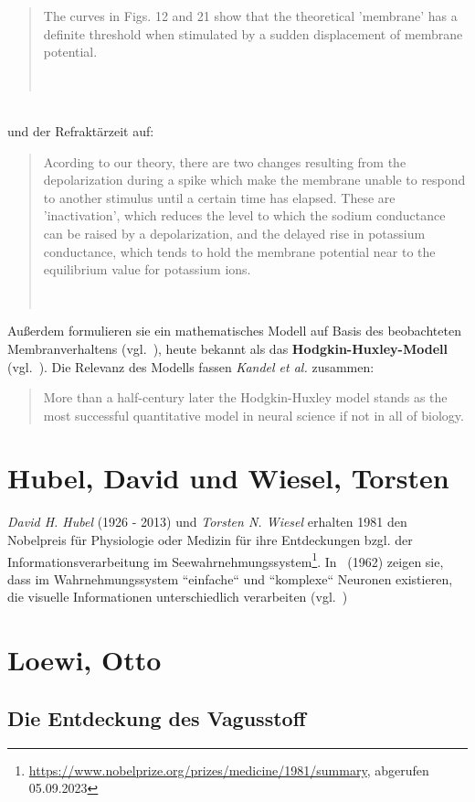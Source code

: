 \blockquote[{~\cite[535]{HH52}}]{
    The curves in Figs. 12 and 21 show that the theoretical 'membrane' has a definite threshold when stimulated by a sudden displacement of membrane potential.
}\\

\noindent
und der Refraktärzeit auf:

\blockquote[{~\cite[532]{HH52}}]{
    Acording to our theory, there are two changes resulting from the depolarization during a spike which make the membrane unable to respond to another stimulus until a certain time has elapsed. These are 'inactivation', which reduces the level to which the sodium conductance can be raised by a depolarization, and the delayed rise in potassium conductance, which tends to hold the membrane potential near to the equilibrium value for potassium ions.
}

Außerdem formulieren sie ein mathematisches Modell auf Basis des beobachteten Membranverhaltens (vgl.~\cite[501, Fig. 1.]{HH52}), heute bekannt als das \textbf{Hodgkin-Huxley-Modell} (vgl.~\cite[144]{Koc98}).
 Die Relevanz des Modells fassen \textit{Kandel et al.} zusammen:

\blockquote[{\cite[156]{KSJ+13}}]{
    More than a half-century later the Hodgkin-Huxley model stands as the most successful quantitative model in neural science if not in all of biology.
}



\section{Hubel, David und Wiesel, Torsten}\label{appendix:hubelwiesel}

\textit{David H. Hubel} (1926 - 2013) und \textit{Torsten N. Wiesel} erhalten 1981 den Nobelpreis für Physiologie oder Medizin für ihre Entdeckungen bzgl. der Informationsverarbeitung im Seewahrnehmungssystem\footnote{
    \url{https://www.nobelprize.org/prizes/medicine/1981/summary}, abgerufen 05.09.2023
}.
In~\cite{HW62} (1962) zeigen sie, dass im Wahrnehmungssystem ``einfache`` und ``komplexe`` Neuronen existieren, die visuelle Informationen unterschiedlich verarbeiten (vgl.~\cite[2819]{Wur09})

\section{Loewi, Otto}\label{appendix:loewi}
\subsection*{Die Entdeckung des Vagusstoff}

